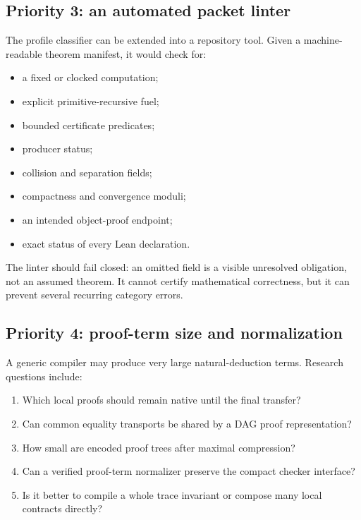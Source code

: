 \subsection{Priority 3: an automated packet linter}

The profile classifier can be extended into a repository tool.  Given a machine-readable theorem manifest, it would check for:

\begin{itemize}
  \item a fixed or clocked computation;
  \item explicit primitive-recursive fuel;
  \item bounded certificate predicates;
  \item producer status;
  \item collision and separation fields;
  \item compactness and convergence moduli;
  \item an intended object-proof endpoint;
  \item exact status of every Lean declaration.
\end{itemize}

The linter should fail closed: an omitted field is a visible unresolved obligation, not an assumed theorem.  It cannot certify mathematical correctness, but it can prevent several recurring category errors.

\subsection{Priority 4: proof-term size and normalization}

A generic compiler may produce very large natural-deduction terms.  Research questions include:

\begin{enumerate}
  \item Which local proofs should remain native until the final transfer?
  \item Can common equality transports be shared by a DAG proof representation?
  \item How small are encoded proof trees after maximal compression?
  \item Can a verified proof-term normalizer preserve the compact checker interface?
  \item Is it better to compile a whole trace invariant or compose many local contracts directly?
\end{enumerate}

